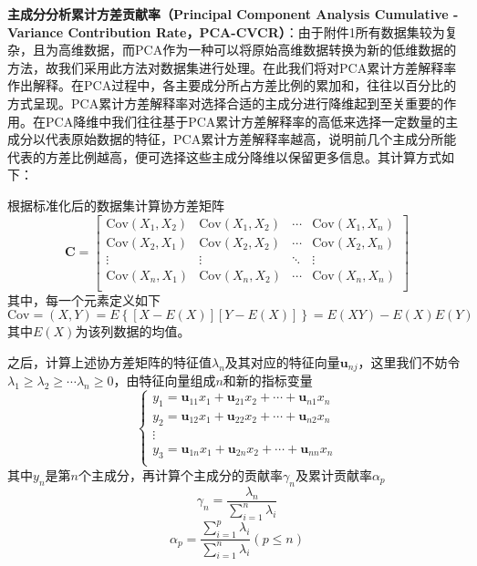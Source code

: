 \documentclass{MathorCupModeling}
\begin{document}
	\textbf{主成分分析累计方差贡献率（Principal Component Analysis Cumulative - Variance Contribution Rate，PCA-CVCR）}\label{PCA-CVCR}：由于附件1所有数据集较为复杂，且为高维数据，而PCA作为一种可以将原始高维数据转换为新的低维数据的方法，故我们采用此方法对数据集进行处理。在此我们将对PCA累计方差解释率作出解释。在PCA过程中，各主要成分所占方差比例的累加和，往往以百分比的方式呈现。PCA累计方差解释率对选择合适的主成分进行降维起到至关重要的作用。在PCA降维中我们往往基于PCA累计方差解释率的高低来选择一定数量的主成分以代表原始数据的特征，PCA累计方差解释率越高，说明前几个主成分所能代表的方差比例越高，便可选择这些主成分降维以保留更多信息。其计算方式如下：
	
	根据标准化后的数据集计算协方差矩阵
	\begin{equation}
		\boldsymbol{C}=\left[ \begin{matrix}
			\text{Cov}\left( X_1,X_2 \right)&		\text{Cov}\left( X_1,X_2 \right)&		\cdots&		\text{Cov}\left( X_1,X_n \right)\\
			\text{Cov}\left( X_2,X_1 \right)&		\text{Cov}\left( X_2,X_2 \right)&		\cdots&		\text{Cov}\left( X_2,X_n \right)\\
			\vdots&		\vdots&		\ddots&		\vdots\\
			\text{Cov}\left( X_n,X_1 \right)&		\text{Cov}\left( X_n,X_2 \right)&		\cdots&		\text{Cov}\left( X_n,X_n \right)\\
		\end{matrix} \right] \label{C}
	\end{equation}
	其中，每一个元素定义如下\textcolor{blue}{\cite{Paper:概率论与数理统计}}
	\begin{equation}
		\text{Cov}=\left( X,Y \right)=E\left\{\left[X-E\left(X\right)\right]\left[Y-E\left(X\right)\right]\right\}=E\left(XY\right)-E\left(X\right)E\left(Y\right) \label{Cov}
	\end{equation}
	其中$E\left(X\right)$为该列数据的均值。

	之后，计算上述协方差矩阵的特征值$\lambda_n$及其对应的特征向量$\boldsymbol{u}_{nj}$，这里我们不妨令$\lambda_1\geqslant\lambda_2\geqslant\cdots\lambda_n\geqslant 0$，由特征向量组成$n$和新的指标变量
	\begin{equation}
		\left\{ \begin{array}{l}
			y_1=\boldsymbol{u}_{11}x_1+\boldsymbol{u}_{21}x_2+\cdots +\boldsymbol{u}_{n1}x_n\\
			y_2=\boldsymbol{u}_{12}x_1+\boldsymbol{u}_{22}x_2+\cdots +\boldsymbol{u}_{n2}x_n\\
			\vdots\\
			y_3=\boldsymbol{u}_{1n}x_1+\boldsymbol{u}_{2n}x_2+\cdots +\boldsymbol{u}_{nn}x_n\\
		\end{array} \right. 
	\end{equation}
	其中$y_n$是第$n$个主成分，再计算个主成分的贡献率$\gamma_n$及累计贡献率$\alpha_p$
	\begin{equation}
		\gamma_n=\frac{\lambda_n}{\sum\limits_{i=1}^n\lambda_i}
	\end{equation}
	\begin{equation}
		\alpha_p=\frac{\sum\limits_{i=1}^p\lambda_i}{\sum\limits_{i=1}^{n}\lambda_i}\left(p\leqslant n\right)
	\end{equation}
	
\end{document}
